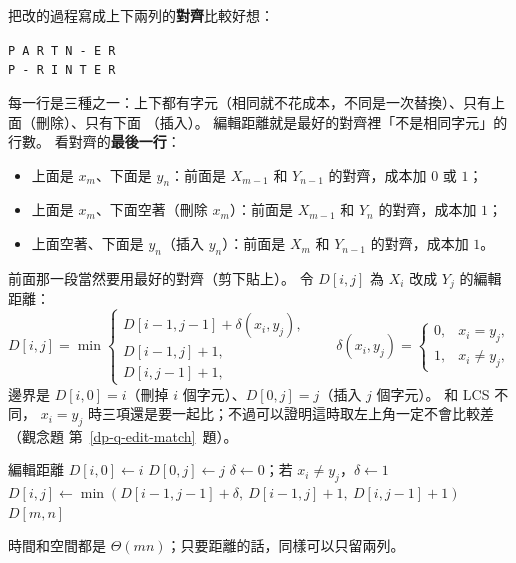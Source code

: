 把改的過程寫成上下兩列的\textbf{對齊}比較好想：
\begin{center}
\texttt{P A R T N - E R}\\
\texttt{P - R I N T E R}
\end{center}
每一行是三種之一：上下都有字元（相同就不花成本，不同是一次替換）、只有上面（刪除）、只有下面
（插入）。 編輯距離就是最好的對齊裡「不是相同字元」的行數。 看對齊的\textbf{最後一行}：
\begin{itemize}
\item 上面是 $x_m$、下面是 $y_n$：前面是 $X_{m-1}$ 和 $Y_{n-1}$ 的對齊，成本加 $0$ 或 $1$；
\item 上面是 $x_m$、下面空著（刪除 $x_m$）：前面是 $X_{m-1}$ 和 $Y_n$ 的對齊，成本加 $1$；
\item 上面空著、下面是 $y_n$（插入 $y_n$）：前面是 $X_m$ 和 $Y_{n-1}$ 的對齊，成本加 $1$。
\end{itemize}
前面那一段當然要用最好的對齊（剪下貼上）。 令 $D[i, j]$ 為 $X_i$ 改成 $Y_j$ 的編輯距離：
\[
D[i, j] = \min\begin{cases}
D[i - 1, j - 1] + \delta(x_i, y_j), \\
D[i - 1, j] + 1, \\
D[i, j - 1] + 1,
\end{cases}
\qquad
\delta(x_i, y_j) = \begin{cases} 0, & x_i = y_j, \\ 1, & x_i \ne y_j, \end{cases}
\]
邊界是 $D[i, 0] = i$（刪掉 $i$ 個字元）、$D[0, j] = j$（插入 $j$ 個字元）。 和 LCS 不同，
$x_i = y_j$ 時三項還是要一起比；不過可以證明這時取左上角一定不會比較差（觀念題
第~\ref{dp-q-edit-match}~題）。

\begin{pseudo}[label=alg:dp-edit]{編輯距離}
        \State $D[i, 0] \gets i$
    \EndFor
        \State $D[0, j] \gets j$
    \EndFor
            \State $\delta \gets 0$；若 $x_i \ne y_j$，$\delta \gets 1$
            \State $D[i, j] \gets \min(D[i - 1, j - 1] + \delta,\ D[i - 1, j] + 1,\ D[i, j - 1] + 1)$
        \EndFor
    \EndFor
    \State \Return $D[m, n]$
\EndFunction
\end{pseudo}

時間和空間都是 $\Theta(mn)$；只要距離的話，同樣可以只留兩列。

